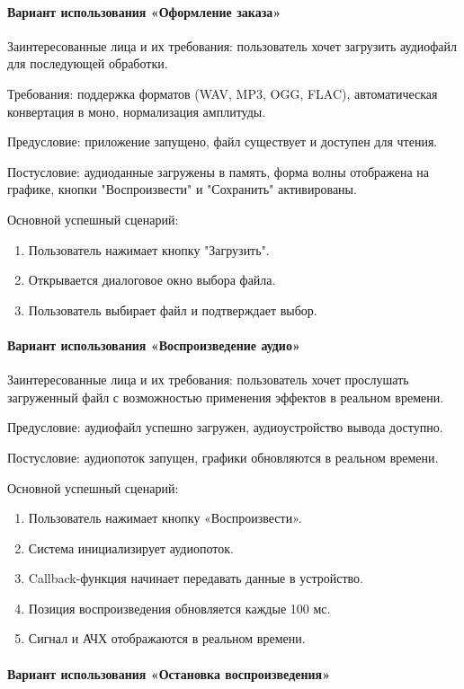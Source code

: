 \paragraph{Вариант использования «Оформление заказа»}
Заинтересованные лица и их требования: пользователь хочет загрузить аудиофайл для последующей обработки.

Требования: поддержка форматов (WAV, MP3, OGG, FLAC), автоматическая конвертация в моно, нормализация амплитуды.

Предусловие: приложение запущено, файл существует и доступен для чтения.

Постусловие: аудиоданные загружены в память, форма волны отображена на графике, кнопки "Воспроизвести" и "Сохранить" активированы.

Основной успешный сценарий:
\begin{enumerate}
	\item Пользователь нажимает кнопку "Загрузить".
	\item Открывается диалоговое окно выбора файла.
	\item Пользователь выбирает файл и подтверждает выбор.
\end{enumerate}

\paragraph{Вариант использования «Воспроизведение аудио»}

Заинтересованные лица и их требования: пользователь хочет прослушать загруженный файл с возможностью применения эффектов в реальном времени.

Предусловие: аудиофайл успешно загружен, аудиоустройство вывода доступно.

Постусловие: аудиопоток запущен, графики обновляются в реальном времени.

Основной успешный сценарий:
\begin{enumerate}
	\item Пользователь нажимает кнопку «Воспроизвести».
	\item Система инициализирует аудиопоток.
	\item Callback-функция начинает передавать данные в устройство.
	\item Позиция воспроизведения обновляется каждые 100 мс.
	\item Сигнал и АЧХ отображаются в реальном времени.
\end{enumerate}

\paragraph{Вариант использования «Остановка воспроизведения»}

